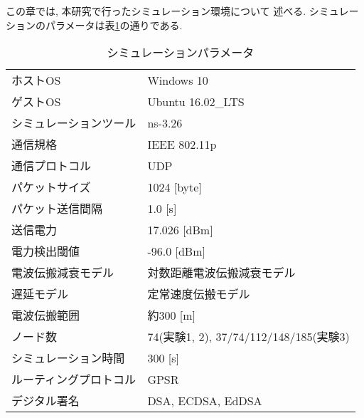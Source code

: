 この章では, 本研究で行ったシミュレーション環境について
述べる. シミュレーションのパラメータは表\ref{tab:simulation_parameter}の通りである.
\setlength{\tabcolsep}{30pt}
\begin{longtable}{ll}
  \caption{シミュレーションパラメータ}
  \label{tab:simulation_parameter}
  \endfirsthead
  \hline
  ホストOS & Windows 10\\
  ゲストOS & Ubuntu 16.02\_LTS\\
  シミュレーションツール & ns-3.26 \\
  通信規格 & IEEE 802.11p \\
  通信プロトコル & UDP \\
  パケットサイズ & 1024 [byte] \\
  パケット送信間隔 & 1.0 [s] \\
  送信電力 & 17.026 [dBm] \\
  電力検出閾値 & -96.0 [dBm] \\
  電波伝搬減衰モデル & 対数距離電波伝搬減衰モデル \\
  遅延モデル & 定常速度伝搬モデル \\
  電波伝搬範囲 & 約300 [m] \\
  ノード数 & 74(実験1, 2), 37/74/112/148/185(実験3) \\
  シミュレーション時間 & 300 [s] \\
  ルーティングプロトコル & GPSR \\
  デジタル署名 & DSA, ECDSA, EdDSA \\ \hline
\end{longtable}
\vspace{3em}


\vspace{2em}

\vspace{2em}

\vspace{1em}

\vspace{2em}

\vspace{2em}

